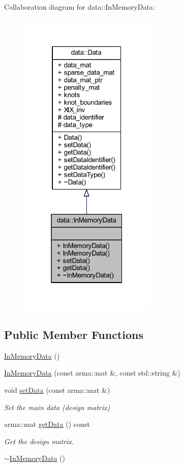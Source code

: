 Collaboration diagram for data\+:\+:In\+Memory\+Data\+:\nopagebreak
\begin{figure}[H]
\begin{center}
\leavevmode
\includegraphics[width=184pt]{classdata_1_1_in_memory_data__coll__graph}
\end{center}
\end{figure}
\subsection*{Public Member Functions}
\begin{DoxyCompactItemize}
\item 
\hyperlink{classdata_1_1_in_memory_data_a85adf030d1a4a1f31f6d852c41750268}{In\+Memory\+Data} ()
\item 
\hyperlink{classdata_1_1_in_memory_data_af9bc156072099d40e45142e4c19f698c}{In\+Memory\+Data} (const arma\+::mat \&, const std\+::string \&)
\item 
void \hyperlink{classdata_1_1_in_memory_data_a0456d66f7930809211c75bcdd80a7bca}{set\+Data} (const arma\+::mat \&)
\begin{DoxyCompactList}\small\item\em Set the main data (design matrix) \end{DoxyCompactList}\item 
arma\+::mat \hyperlink{classdata_1_1_in_memory_data_ac0993c38a9633fa0f1ff787660b86c71}{get\+Data} () const
\begin{DoxyCompactList}\small\item\em Get the design matrix. \end{DoxyCompactList}\item 
\hyperlink{classdata_1_1_in_memory_data_a675c78a5c7537ca16b8ce86b3ea1f7b3}{$\sim$\+In\+Memory\+Data} ()
\end{DoxyCompactItemize}
